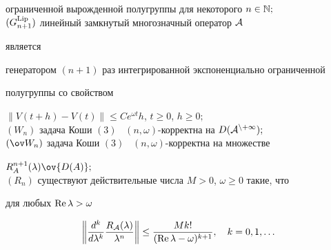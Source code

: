 \begin{thmnonum}
ограниченной вырожденной полугруппы для некоторого $n\in\Bbb N;$ \\


$(G^{\operatorname{Lip}}_{n+1})$ линейный замкнутый многозначный оператор $\cal A$ 


является 


генератором $(n+1)$ раз интегрированной экспоненциально ограниченной 


полугруппы со свойством 


$\|V(t+h)-V(t)\|\le C e^{\omega t}h$, $t\ge0$, $h\ge0;$ \\


$(W_n)$ задача Коши $(3)$ \ $(n,\omega)$-корректна на $D(\cal 


A^{n+1});$ \\


$(\ov W_n)$ задача Коши $(3)$ \ $(n,\omega)$-корректна на множестве 


$R^{n+1}_A(\lambda)\ov{D(A)};$ \\


$(R_n)$ существуют действительные числа $M>0$, $\omega\ge0$ такие, что 


для любых $\operatorname{Re}\lambda>\omega$ 


$$ 


\bigg\|\frac{d^k}{d\lambda^k}\frac{R_{\cal A}(\lambda)}{\lambda^n}\bigg\|\le 


\frac{M k!}{(\re\lambda-\omega)^{k+1}},\quad k=0,1,\dotsc 


$$ 


\end{thmnonum} 


 


 


